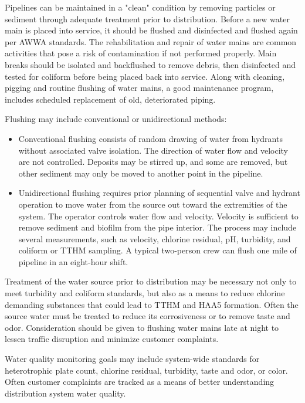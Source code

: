 \documentclass[10pt]{article}
\begin{document}
Pipelines can be maintained in a "clean" condition by removing particles or sediment through adequate treatment prior to distribution. Before a new water main is placed into service, it should be flushed and disinfected and flushed again per AWWA standards. The rehabilitation and repair of water mains are common activities that pose a risk of contamination if not performed properly. Main breaks should be isolated and backflushed to remove debris, then disinfected and tested for coliform before being placed back into service. Along with cleaning, pigging and routine flushing of water mains, a good maintenance program, includes scheduled replacement of old, deteriorated piping.

Flushing may include conventional or unidirectional methods:

\begin{itemize}
  \item Conventional flushing consists of random drawing of water from hydrants without associated valve isolation. The direction of water flow and velocity are not controlled. Deposits may be stirred up, and some are removed, but other sediment may only be moved to another point in the pipeline.

  \item Unidirectional flushing requires prior planning of sequential valve and hydrant operation to move water from the source out toward the extremities of the system. The operator controls water flow and velocity. Velocity is sufficient to remove sediment and biofilm from the pipe interior. The process may include several measurements, such as velocity, chlorine residual, $\mathrm{pH}$, turbidity, and coliform or TTHM sampling. A typical two-person crew can flush one mile of pipeline in an eight-hour shift.

\end{itemize}
Treatment of the water source prior to distribution may be necessary not only to meet turbidity and coliform standards, but also as a means to reduce chlorine demanding substances that could lead to TTHM and HAA5 formation. Often the source water must be treated to reduce its corrosiveness or to remove taste and odor. Consideration should be given to flushing water mains late at night to lessen traffic disruption and minimize customer complaints.

Water quality monitoring goals may include system-wide standards for heterotrophic plate count, chlorine residual, turbidity, taste and odor, or color. Often customer complaints are tracked as a means of better understanding distribution system water quality.
\end{document}
